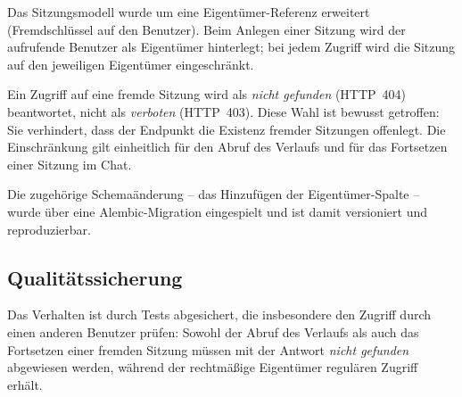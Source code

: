 \documentclass[11pt,a4paper]{article}
\begin{document}
Das Sitzungsmodell wurde um eine Eigentümer-Referenz erweitert (Fremdschlüssel auf den
Benutzer). Beim Anlegen einer Sitzung wird der aufrufende Benutzer als Eigentümer
hinterlegt; bei jedem Zugriff wird die Sitzung auf den jeweiligen Eigentümer
eingeschränkt.

Ein Zugriff auf eine fremde Sitzung wird als \emph{nicht gefunden} (HTTP~404)
beantwortet, nicht als \emph{verboten} (HTTP~403). Diese Wahl ist bewusst getroffen:
Sie verhindert, dass der Endpunkt die Existenz fremder Sitzungen offenlegt. Die
Einschränkung gilt einheitlich für den Abruf des Verlaufs und für das Fortsetzen einer
Sitzung im Chat.

Die zugehörige Schemaänderung -- das Hinzufügen der Eigentümer-Spalte -- wurde über
eine Alembic-Migration eingespielt und ist damit versioniert und reproduzierbar.

\subsection{Qualitätssicherung}

Das Verhalten ist durch Tests abgesichert, die insbesondere den Zugriff durch einen
anderen Benutzer prüfen: Sowohl der Abruf des Verlaufs als auch das Fortsetzen einer
fremden Sitzung müssen mit der Antwort \emph{nicht gefunden} abgewiesen werden, während
der rechtmäßige Eigentümer regulären Zugriff erhält.
\end{document}
